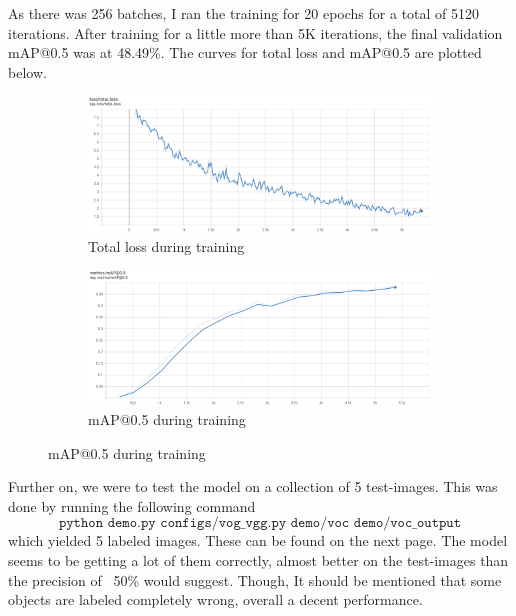As there was 256 batches, I ran the training for 20 epochs for a total of 5120 iterations.
After training for a little more than 5K iterations, the final validation mAP@0.5 was at 48.49\%.
The curves for total loss and mAP@0.5 are plotted below.

\begin{figure}[h!]
    \centering
    \begin{subfigure}[b]{\textwidth}
        \centering
        \includegraphics[width=\textwidth]{Images/task4f_total_loss.png}
        \caption*{Total loss during training}
    \end{subfigure}
    \hfill
    \begin{subfigure}[b]{\textwidth}
        \centering
        \includegraphics[width=\textwidth]{Images/task4f_map05.png}
        \caption*{mAP@0.5 during training}
    \end{subfigure}
\end{figure}


Further on, we were to test the model on a collection of 5 test-images. 
This was done by running the following command
\begin{equation*}
    \texttt{python demo.py configs/vog\_vgg.py demo/voc demo/voc\_output}
\end{equation*}
which yielded 5 labeled images. These can be found on the next page.
The model seems to be getting a lot of them correctly, 
almost better on the test-images than the precision of ~50\% would suggest.
Though, It should be mentioned that some objects are labeled completely wrong, overall a decent performance. 


